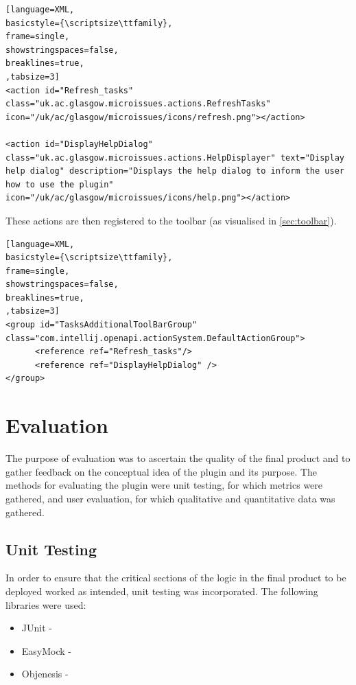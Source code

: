 \documentclass{4thYearProject}
\begin{document}
\begin{lstlisting}[language=XML, 
basicstyle={\scriptsize\ttfamily}, 
frame=single,
showstringspaces=false,
breaklines=true,
,tabsize=3]
<action id="Refresh_tasks" class="uk.ac.glasgow.microissues.actions.RefreshTasks" icon="/uk/ac/glasgow/microissues/icons/refresh.png"></action>

<action id="DisplayHelpDialog" class="uk.ac.glasgow.microissues.actions.HelpDisplayer" text="Display help dialog" description="Displays the help dialog to inform the user how to use the plugin" icon="/uk/ac/glasgow/microissues/icons/help.png"></action>

\end{lstlisting}

These actions are then registered to the toolbar (as visualised in \ref{sec:toolbar}).

\begin{lstlisting}[language=XML, 
basicstyle={\scriptsize\ttfamily}, 
frame=single,
showstringspaces=false,
breaklines=true,
,tabsize=3]
<group id="TasksAdditionalToolBarGroup" class="com.intellij.openapi.actionSystem.DefaultActionGroup">
      <reference ref="Refresh_tasks"/>
      <reference ref="DisplayHelpDialog" />
</group>

\end{lstlisting}

\chapter{Evaluation}
The purpose of evaluation was to ascertain the quality of the final product and to gather feedback on the conceptual idea of the plugin and its purpose. The methods for evaluating the plugin were unit testing, for which metrics were gathered, and user evaluation, for which qualitative and quantitative data was gathered.

\section{Unit Testing}

In order to ensure that the critical sections of the logic in the final product to be deployed worked as intended, unit testing was incorporated. The following libraries were used:

\begin{itemize}
\item JUnit - 
\item EasyMock - 
\item Objenesis - 
\end{itemize}
\end{document}
